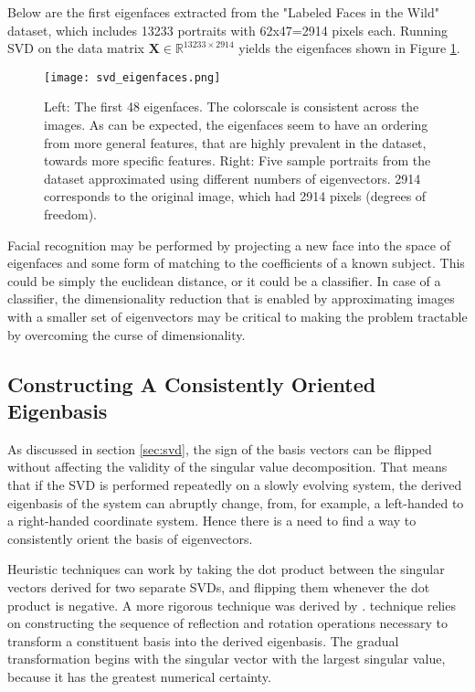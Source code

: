 Below are the first eigenfaces extracted from the "Labeled Faces in the Wild" dataset, which includes 13233 portraits with 62x47=2914 pixels each. Running SVD on the data matrix $\mathbf{X} \in \mathbb{R}^{13233\times 2914}$ yields the eigenfaces shown in Figure \ref{fig:svd_eigenfaces}.

\begin{figure}
\centering
    \texttt{[image: svd\_eigenfaces.png]}
    \caption{Left: The first 48 eigenfaces. The colorscale is consistent across the images. As can be expected, the eigenfaces seem to have an ordering from more general features, that are highly prevalent in the dataset, towards more specific features. Right: Five sample portraits from the dataset approximated using different numbers of eigenvectors. 2914 corresponds to the original image, which had 2914 pixels (degrees of freedom).}
    \label{fig:svd_eigenfaces}
\end{figure}

Facial recognition may be performed by projecting a new face into the space of eigenfaces and some form of matching to the coefficients of a known subject. This could be simply the euclidean distance, or it could be a classifier. In case of a classifier, the dimensionality reduction that is enabled by approximating images with a smaller set of eigenvectors may be critical to making the problem tractable by overcoming the curse of dimensionality.


\subsection{Constructing A Consistently Oriented Eigenbasis}
	
As discussed in section \ref{sec:svd}, the sign of the basis vectors can be flipped without affecting the validity of the singular value decomposition. That means that if the SVD is performed repeatedly on a slowly evolving system, the derived eigenbasis of the system can abruptly change, from, for example, a left-handed to a right-handed coordinate system. Hence there is a need to find a way to consistently orient the basis of eigenvectors. 

Heuristic techniques can work by taking the dot product between the singular vectors derived for two separate SVDs, and flipping them whenever the dot product is negative. A more rigorous technique was derived by .  technique relies on constructing the sequence of reflection and rotation operations necessary to transform a constituent basis into the derived eigenbasis. The gradual transformation begins with the singular vector with the largest singular value, because it has the greatest numerical certainty. 

